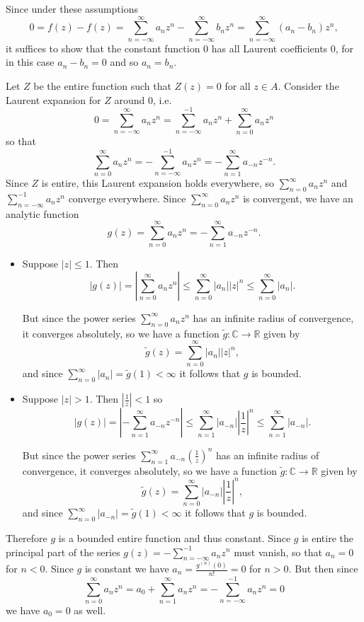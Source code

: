 \documentclass{article}
\begin{document}
\begin{Answer}
Since under these assumptions
$$
  0 
= f(z) - f(z) 
= \sum_{n=-\infty}^\infty a_n z^n - \sum_{n=-\infty}^\infty b_n z^n
= \sum_{n=-\infty}^\infty (a_n - b_n) z^n,
$$
it suffices to show that the constant function 0 has all
Laurent coefficients 0, for in this case $a_n - b_n = 0$ and
so $a_n = b_n$.

Let $Z$ be the entire function such that 
$Z(z) = 0$ for all $z \in A$. Consider the Laurent expansion for $Z$ around 0, i.e.
$$
  0
= \sum_{n=-\infty}^\infty a_n z^n 
= \sum_{n=-\infty}^{-1} a_n z^n
+ \sum_{n=0}^\infty a_n z^n
$$
so that
$$
   \sum_{n=0}^\infty a_n z^n 
= -\sum_{n=-\infty}^{-1} a_n z^n
= -\sum_{n=1}^\infty a_{-n} z^{-n}.
$$
Since $Z$ is entire, this Laurent expansion holds everywhere, so
$\sum_{n=0}^\infty a_n z^n$ and $\sum_{n=-\infty}^{-1} a_n z^n$ converge everywhere.
Since $\sum_{n=0}^\infty a_n z^n$ is convergent, we have an analytic
function
$$
g(z) = \sum_{n=0}^\infty a_n z^n = -\sum_{n=1}^\infty a_{-n} z^{-n}.
$$
\begin{itemize}
  \item{
    Suppose $|z| \leq 1$. Then
    $$
         |g(z)| 
    =    \left|\sum_{n=0}^\infty a_n z^n\right|
    \leq \sum_{n=0}^\infty |a_n| |z|^n
    \leq \sum_{n=0}^\infty |a_n|.
    $$
    
    But since the power series 
    $\sum_{n=0}^\infty a_n z^n$ has an infinite radius of convergence,
    it converges absolutely, so we have a function 
    $\tilde{g} : \mathbb{C} \to \mathbb{R}$ given by
    $$
    \tilde{g}(z) = \sum_{n=0}^\infty |a_n||z|^n,
    $$
    and since $\sum_{n=0}^\infty |a_n| = \tilde{g}(1) < \infty$
    it follows that $g$ is bounded.
  }
  \item{
    Suppose $|z| > 1$. Then $\left|\frac{1}{z}\right| < 1$ so
    $$
         |g(z)|
    =    \left|-\sum_{n=1}^\infty a_{-n} z^{-n}\right|
    \leq \sum_{n=1}^\infty 
           |a_{-n}|
           \left|\frac{1}{z}\right|^n
    \leq \sum_{n=1}^\infty |a_{-n}|.
    $$

    But since the power series 
    $\sum_{n=1}^\infty a_{-n} \left(\frac{1}{z}\right)^n$ has an infinite
    radius of convergence, it converges absolutely, so we have a function
    $\tilde{g} : \mathbb{C} \to \mathbb{R}$ given by
    $$
    \tilde{g}(z) = \sum_{n=0}^\infty |a_{-n}|\left|\frac{1}{z}\right|^n,
    $$
    and since $\sum_{n=0}^\infty |a_{-n}| = \tilde{g}(1) < \infty$ it follows
    that $g$ is bounded.
  }
\end{itemize}
Therefore $g$ is a bounded entire function and thus constant.
Since $g$ is entire the principal part of the series
$g(z) = -\sum_{n=-\infty}^{-1} a_n z^n$ must vanish, so that 
$a_{n} = 0$ for $n < 0$.
Since $g$ is constant we have $a_n = \frac{g^{(n)}(0)}{n!} = 0$ for
$n > 0$. But then since
$$
  \sum_{n=0}^\infty a_n z^n 
= a_0 + \sum_{n=1}^\infty a_n z^n
= -\sum_{n=-\infty}^{-1} a_n z^n
= 0
$$
we have $a_0 = 0$ as well.
\end{Answer}
\end{document}
